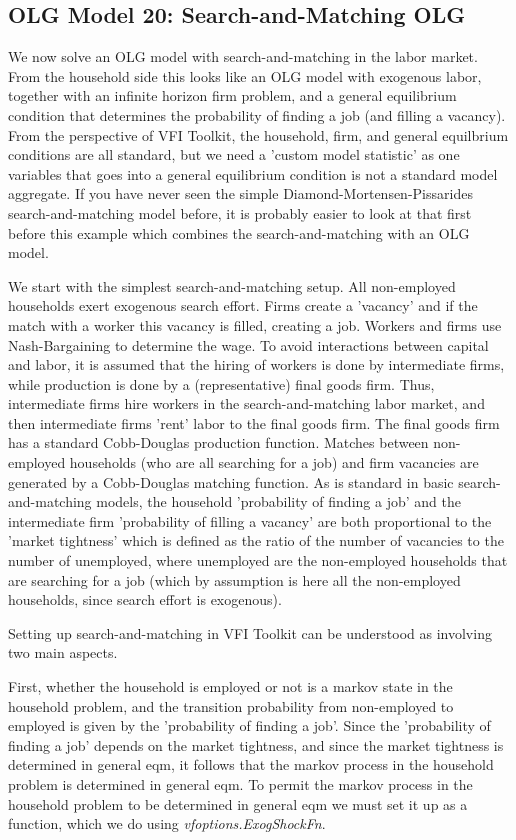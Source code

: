 \subsection{OLG Model 20: Search-and-Matching OLG}
We now solve an OLG model with search-and-matching in the labor market. From the household side this looks like an OLG model with exogenous labor, together with an infinite horizon firm problem, and a general equilibrium condition that determines the probability of finding a job (and filling a vacancy). From the perspective of VFI Toolkit, the household, firm, and general equilbrium conditions are all standard, but we need a 'custom model statistic' as one variables that goes into a general equilibrium condition is not a standard model aggregate. If you have never seen the simple Diamond-Mortensen-Pissarides search-and-matching model before, it is probably easier to look at that first before this example which combines the search-and-matching with an OLG model.

We start with the simplest search-and-matching setup. All non-employed households exert exogenous search effort. Firms create a 'vacancy' and if the match with a worker this vacancy is filled, creating a job. Workers and firms use Nash-Bargaining to determine the wage. To avoid interactions between capital and labor, it is assumed that the hiring of workers is done by intermediate firms, while production is done by a (representative) final goods firm. Thus, intermediate firms hire workers in the search-and-matching labor market, and then intermediate firms 'rent' labor to the final goods firm. The final goods firm has a standard Cobb-Douglas production function. Matches between non-employed households (who are all searching for a job) and firm vacancies are generated by a Cobb-Douglas matching function. As is standard in basic search-and-matching models, the household 'probability of finding a job' and the intermediate firm 'probability of filling a vacancy' are both proportional to the 'market tightness' which is defined as the ratio of the number of vacancies to the number of unemployed, where unemployed are the non-employed households that are searching for a job (which by assumption is here all the non-employed households, since search effort is exogenous).

Setting up search-and-matching in VFI Toolkit can be understood as involving two main aspects.

First, whether the household is employed or not is a markov state in the household problem, and the transition probability from non-employed to employed is given by the 'probability of finding a job'. Since the 'probability of finding a job' depends on the market tightness, and since the market tightness is determined in general eqm, it follows that the markov process in the household problem is determined in general eqm. To permit the markov process in the household problem to be determined in general eqm we must set it up as a function, which we do using \textit{vfoptions.ExogShockFn}.


